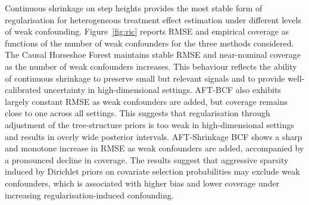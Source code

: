 Continuous shrinkage on step heights provides the most stable form of regularisation for heterogeneous treatment effect estimation under different levels of weak confounding. 
Figure~\ref{fig:ric} reports RMSE and empirical coverage as functions of the number of weak confounders for the three methods considered. 
The Causal Horseshoe Forest maintains stable RMSE and near-nominal coverage as the number of weak confounders increases.
This behaviour reflects the ability of continuous shrinkage to preserve small but relevant signals and to provide well-calibrated uncertainty in high-dimensional settings.
AFT-BCF also exhibits largely constant RMSE as weak confounders are added, but coverage remains close to one across all settings. 
This suggests that regularisation through adjustment of the tree-structure priors is too weak in high-dimensional settings and results in overly wide posterior intervals.
AFT-Shrinkage BCF shows a sharp and monotone increase in RMSE as weak confounders are added, accompanied by a pronounced decline in coverage. 
The results suggest that aggressive sparsity induced by Dirichlet priors on covariate selection probabilities may exclude weak confounders, which is associated with higher bias and lower coverage under increasing regularisation-induced confounding.
